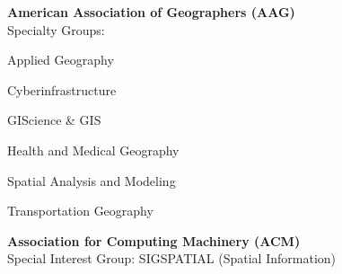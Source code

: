 \documentclass{acmcv}
\begin{document}
\vspace*{.2cm}

    \textbf{American Association of Geographers (AAG)} \\
    Specialty Groups: \\ \vspace{-.3cm}
    \begin{multicols}{2}
    \begin{titemize}
        \item Applied Geography
        \item Cyberinfrastructure
        \item GIScience \& GIS
        \item Health and Medical Geography
        \item Spatial Analysis and Modeling
        \item Transportation Geography
    \end{titemize}
    \end{multicols}
    \vspace*{-0.2cm}

    \textbf{Association for Computing Machinery (ACM)} \\
    Special Interest Group:  SIGSPATIAL (Spatial Information)


\vspace*{0.5cm}
\vspace*{0.25cm}
\end{document}
